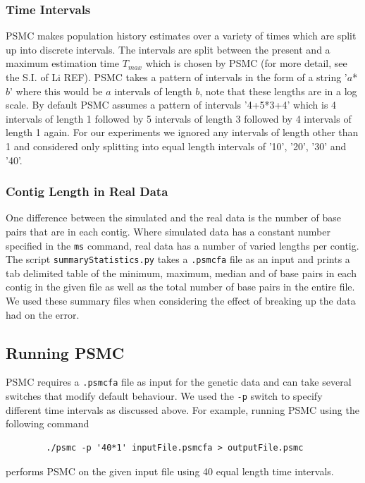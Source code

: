 \documentclass[11pt,a4paper]{article}
\begin{document}
\subsubsection{Time Intervals}
PSMC makes population history estimates over a variety of times which are split up into discrete intervals. The intervals are split between the present and a maximum estimation time $T_{max}$ which is chosen by PSMC (for more detail, see the S.I. of Li REF). PSMC takes a pattern of intervals in the form of a string '$a$*$b$' where this would be $a$ intervals of length $b$, note that these lengths are in a log scale. By default PSMC assumes a pattern of intervals '4+5*3+4' which is 4 intervals of length 1 followed by 5 intervals of length 3 followed by 4 intervals of length 1 again. For our experiments we ignored any intervals of length other than 1 and considered only splitting into equal length intervals of '10', '20', '30' and '40'.

\subsubsection{Contig Length in Real Data}\label{contigLength}
One difference between the simulated and the real data is the number of base pairs that are in each contig. Where simulated data has a constant number specified in the \verb|ms| command, real data has a number of varied lengths per contig. The script \verb|summaryStatistics.py| takes a \verb|.psmcfa| file as an input and prints a tab delimited table of the minimum, maximum, median and of base pairs in each contig in the given file as well as the total number of base pairs in the entire file. We used these summary files when considering the effect of breaking up the data had on the error.

\subsection{Running PSMC}
PSMC requires a \verb|.psmcfa| file as input for the genetic data and can take several switches that modify default behaviour. We used the \verb|-p| switch to specify different time intervals as discussed above. For example, running PSMC using the following command
\begin{verbatim}
		./psmc -p '40*1' inputFile.psmcfa > outputFile.psmc
\end{verbatim}
performs PSMC on the given input file using 40 equal length time intervals.
\end{document}

